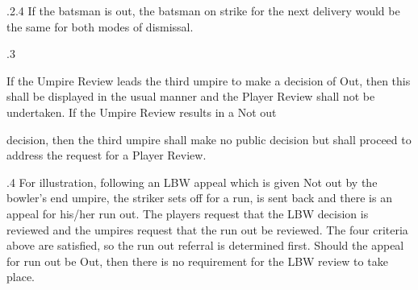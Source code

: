 \documentclass[12pt]{article}
\begin{document}
\vspace{\baselineskip}
\begin{adjustwidth}{1.18in}{0.26in}
{\fontsize{9pt}{10.8pt}.2.4 \tabto{1.17in} If the batsman is out, the batsman on strike for the next delivery would be the same for both modes of dismissal.\par}\par

\end{adjustwidth}


\vspace{\baselineskip}
\begin{adjustwidth}{0.5in}{0.25in}
{\fontsize{9pt}{10.8pt}.3 \tabto{0.49in} {\fontsize{8pt}{9.6pt}\selectfont If the Umpire Review leads the third umpire to make a decision of Out, then this shall be displayed in the usual manner and the Player Review shall not be undertaken. If the Umpire Review results in a Not out\par}\par}\par

\end{adjustwidth}


\vspace{\baselineskip}

\vspace{\baselineskip}

\vspace{\baselineskip}
\begin{Center}
{\fontsize{8pt}{9.6pt}\par}
\end{Center}\par


\vspace{\baselineskip}

\vspace{\baselineskip}
\begin{adjustwidth}{0.5in}{0.12in}
{\fontsize{9pt}{10.8pt}\selectfont decision, then the third umpire shall make no public decision but shall proceed to address the request for a Player Review.\par}\par

\end{adjustwidth}


\vspace{\baselineskip}
\begin{adjustwidth}{0.5in}{0.11in}
{\fontsize{9pt}{10.8pt}.4 \tabto{0.49in} For illustration, following an LBW appeal which is given Not out by the bowler’s end umpire, the striker sets off for a run, is sent back and there is an appeal for his/her run out. The players request that the LBW decision is reviewed and the umpires request that the run out be reviewed. The four criteria above are satisfied, so the run out referral is determined first. Should the appeal for run out be Out, then there is no requirement for the LBW review to take place.\par}\par

\end{adjustwidth}
\end{document}

